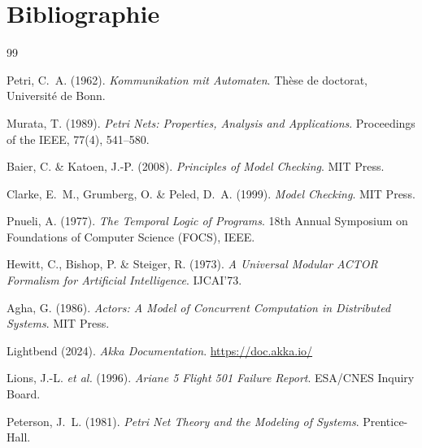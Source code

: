 \documentclass[11pt,a4paper]{article}
\begin{document}
\section*{Bibliographie}

\begin{thebibliography}{99}

Petri, C.~A. (1962).
\emph{Kommunikation mit Automaten}.
Thèse de doctorat, Université de Bonn.

Murata, T. (1989).
\emph{Petri Nets: Properties, Analysis and Applications}.
Proceedings of the IEEE, 77(4), 541--580.

Baier, C. \& Katoen, J.-P. (2008).
\emph{Principles of Model Checking}.
MIT Press.

Clarke, E.~M., Grumberg, O. \& Peled, D.~A. (1999).
\emph{Model Checking}.
MIT Press.

Pnueli, A. (1977).
\emph{The Temporal Logic of Programs}.
18th Annual Symposium on Foundations of Computer Science (FOCS), IEEE.

Hewitt, C., Bishop, P. \& Steiger, R. (1973).
\emph{A Universal Modular ACTOR Formalism for Artificial Intelligence}.
IJCAI'73.

Agha, G. (1986).
\emph{Actors: A Model of Concurrent Computation in Distributed Systems}.
MIT Press.

Lightbend (2024).
\emph{Akka Documentation}.
\url{https://doc.akka.io/}

Lions, J.-L. \emph{et al.} (1996).
\emph{Ariane 5 Flight 501 Failure Report}.
ESA/CNES Inquiry Board.

Peterson, J.~L. (1981).
\emph{Petri Net Theory and the Modeling of Systems}.
Prentice-Hall.

\end{thebibliography}
\end{document}
